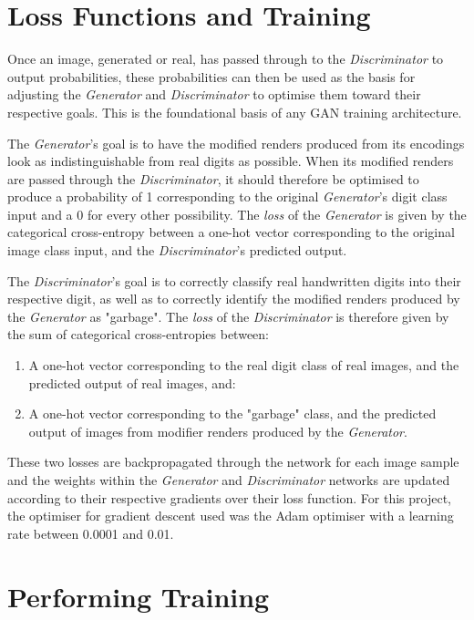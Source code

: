 \documentclass[a4paper,11pt,openany]{book}
\begin{document}
\section*{Loss Functions and Training}
\label{sec:org6fe21c7}

Once an image, generated or real, has passed through to the \emph{Discriminator} to output probabilities, these probabilities can then be used as the basis for adjusting the \emph{Generator} and \emph{Discriminator} to optimise them toward their respective goals.
This is the foundational basis of any GAN training architecture.

The \emph{Generator}'s goal is to have the modified renders produced from its encodings look as indistinguishable from real digits as possible.
When its modified renders are passed through the \emph{Discriminator}, it should therefore be optimised to produce a probability of 1 corresponding to the original \emph{Generator}'s digit class input and a 0 for every other possibility.
The \emph{loss} of the \emph{Generator} is given by the categorical cross-entropy between a one-hot vector corresponding to the original image class input, and the \emph{Discriminator}'s predicted output.

The \emph{Discriminator}'s goal is to correctly classify real handwritten digits into their respective digit, as well as to correctly identify the modified renders produced by the \emph{Generator} as "garbage".
The \emph{loss} of the \emph{Discriminator} is therefore given by the sum of categorical cross-entropies between:
\begin{enumerate}
\item A one-hot vector corresponding to the real digit class of real images, and the predicted output of real images, and:
\item A one-hot vector corresponding to the "garbage" class, and the predicted output of images from modifier renders produced by the \emph{Generator}.
\end{enumerate}

These two losses are backpropagated through the network for each image sample and the weights within the \emph{Generator} and \emph{Discriminator} networks are updated according to their respective gradients over their loss function.
For this project, the optimiser for gradient descent used was the Adam optimiser with a learning rate between 0.0001 and 0.01.

\section*{Performing Training}
\label{sec:org155c290}
\end{document}
